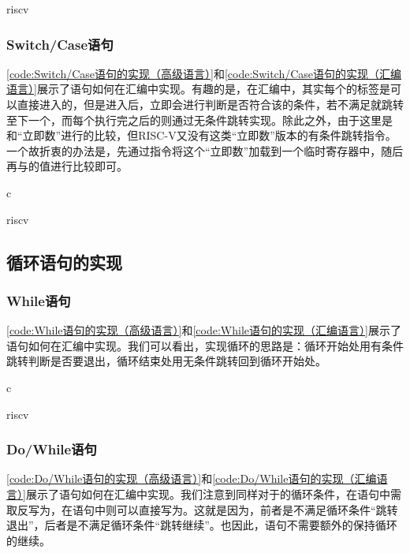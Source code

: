\begin{Code}{riscv}
    
\end{Code}

\subsubsection{Switch/Case语句}
\cref{code:Switch/Case语句的实现（高级语言）}和\cref{code:Switch/Case语句的实现（汇编语言）}展示了语句如何在汇编中实现。有趣的是，在汇编中，其实每个的标签是可以直接进入的，但是进入后，立即会进行判断是否符合该的条件，若不满足就跳转至下一个，而每个执行完之后的则通过无条件跳转实现。除此之外，由于这里是和“立即数”进行的比较，但RISC-V又没有这类“立即数”版本的有条件跳转指令。一个故折衷的办法是，先通过指令将这个“立即数”加载到一个临时寄存器中，随后再与的值进行比较即可。
\begin{Code}{c}
    
\end{Code}

\begin{Code}{riscv}
    
\end{Code}

\subsection{循环语句的实现}

\subsubsection{While语句}
\cref{code:While语句的实现（高级语言）}和\cref{code:While语句的实现（汇编语言）}展示了语句如何在汇编中实现。我们可以看出，实现循环的思路是：循环开始处用有条件跳转判断是否要退出，循环结束处用无条件跳转回到循环开始处。
\begin{Code}{c}
    
\end{Code}

\begin{Code}{riscv}
    
\end{Code}

\subsubsection{Do/While语句}
\cref{code:Do/While语句的实现（高级语言）}和\cref{code:Do/While语句的实现（汇编语言）}展示了语句如何在汇编中实现。我们注意到同样对于的循环条件，在语句中需取反写为，在语句中则可以直接写为。这就是因为，前者是不满足循环条件“跳转退出”，后者是不满足循环条件“跳转继续”。也因此，语句不需要额外的保持循环的继续。 


